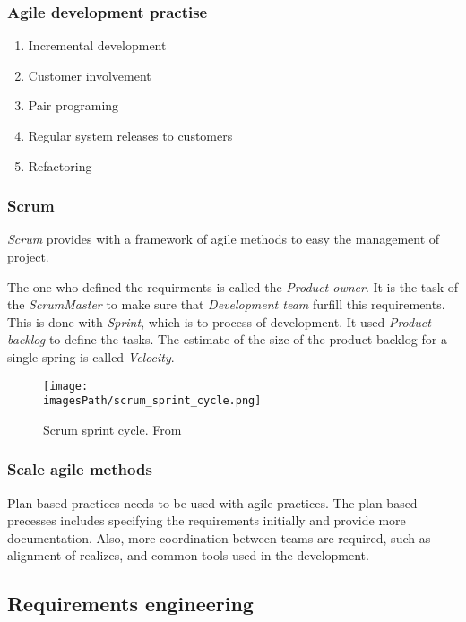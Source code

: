 \subsubsection{Agile development practise}
\begin{enumerate}
\item Incremental development
\item Customer involvement
\item Pair programing
\item Regular system releases to customers
\item Refactoring
\end{enumerate}

\subsubsection{Scrum}
\textit{Scrum} provides with a framework of agile methods to easy the management of
project. 

The one who defined the requirments is called the \textit{Product owner}.
It is the task of the \textit{ScrumMaster} to make sure that \textit{Development team}
furfill this requirements. This is done with \textit{Sprint}, which is to process of
development. It used \textit{Product backlog} to define the tasks. The estimate of the size
of the product backlog for a single spring is called \textit{Velocity}.


\begin{figure}[!ht]
    \centering
    \texttt{[image: \\imagesPath/scrum\_sprint\_cycle.png]}
    \caption{Scrum sprint cycle. From \cite{}}
\end{figure}



\subsubsection{Scale agile methods}
Plan-based practices needs to be used with agile practices.
The plan based precesses includes specifying the requirements initially
and provide more documentation. Also, more coordination between teams are required,
such as alignment of realizes, and common tools used in the development.


\subsection{Requirements engineering}
